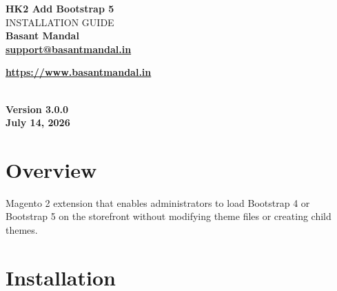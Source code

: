 \documentclass[11pt,a4paper]{article}
\begin{document}
\begin{titlepage}
\centering

\vspace*{4cm}

{\Huge\bfseries HK2 Add Bootstrap 5}\\[0.6cm]

{\Large INSTALLATION GUIDE}\\[2.5cm]

{\Large \textbf{Basant Mandal}}\\[0.9cm]

\href{mailto:support@basantmandal.in}{\textbf{support@basantmandal.in}}

\vspace{0.3cm}

\href{https://www.basantmandal.in}{\textbf{https://www.basantmandal.in}}

\\[5cm]

{\textbf{Version 3.0.0}}\\[0.3cm]

{\textbf{July 14, 2026}}\\[4cm]

\vfill

\end{titlepage}

\tableofcontents
\newpage

\section{Overview}

Magento 2 extension that enables administrators to load Bootstrap 4 or Bootstrap 5 on the storefront without modifying theme files or creating child themes.

\section{Installation}
\end{document}
